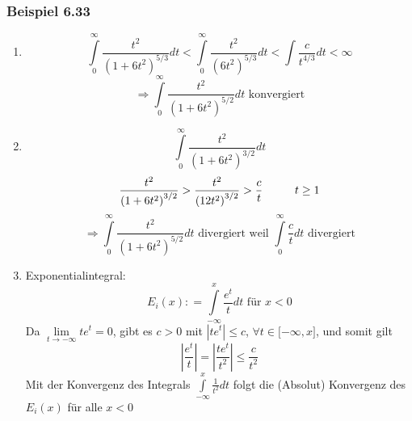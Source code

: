 \subsubsection*{Beispiel 6.33}
\begin{enumerate}
\item \[\int\limits_0^\infty  {\frac{{{t^2}}}{{{{\left( {1 + 6{t^2}} \right)}^{5/3}}}}dt}  < \int\limits_0^\infty  {\frac{{{t^2}}}{{{{\left( {6{t^2}} \right)}^{5/3}}}}dt}  < \int {\frac{c}{{{t^{4/3}}}}dt < \infty } \]
$$\Rightarrow\int\limits_0^\infty  {\frac{{{t^2}}}{{{{\left( {1 + 6{t^2}} \right)}^{5/2}}}}dt} \text{ konvergiert}$$
\item \[\int\limits_0^\infty  {\frac{{{t^2}}}{{{{\left( {1 + 6{t^2}} \right)}^{3/2}}}}dt} \]   
\[\frac{{{t^2}}}{{{{\left( {1 + 6{t^2}} \right)}^{3/2}}}} > \frac{{{t^2}}}{{{{\left( {12{t^2}} \right)}^{3/2}}}} > \frac{c}{t}\text{\hspace{10mm}}t\geq 1\]
\[\Rightarrow\int\limits_0^\infty  {\frac{{{t^2}}}{{{{\left( {1 + 6{t^2}} \right)}^{5/2}}}}} dt\text{ divergiert weil }\int\limits_0^\infty  {\frac{c}{t}} dt\text{ divergiert}\]
\item Exponentialintegral:
\[{E_i}(x): = \int\limits_{ - \infty }^x  {\frac{{{e^t}}}{t}dt} \text{ für }x<0\]
Da $\mathop {\lim }\limits_{t \to  - \infty } t{e^t} = 0$, gibt es $c>0$ mit $\left| {t{e^t}} \right| \le c$, $\forall t\in\lbrack -\infty ,x\rbrack$, und somit gilt \[\left| {\frac{{{e^t}}}{t}} \right| = \left| {\frac{{t{e^t}}}{{{t^2}}}} \right| \le \frac{c}{{{t^2}}}\] Mit der Konvergenz des Integrals $\int\limits_{ - \infty }^x {\frac{1}{{{t^2}}}dt} $ folgt die (Absolut) Konvergenz des $E_i(x)$ für alle $x<0$
\end{enumerate}

